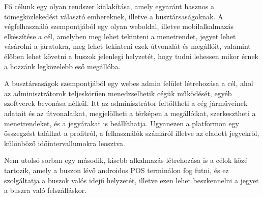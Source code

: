 Fő célunk egy olyan rendszer kialakítása, amely egyaránt hasznos a
tömegközlekedést választó embereknek, illetve a busztársaságoknak. A végfelhasználó
szempontjából egy olyan weboldal, illetve mobilalkalmazás elkészítése a cél, amelyben meg
lehet tekinteni a menetrendet, jegyet lehet vásárolni a járatokra, meg lehet tekinteni ezek útvonalát és megállóit, valamint élőben lehet követni a buszok jelenlegi helyzetét, hogy tudni lehessen mikor érnek a hozzánk legközelebb eső megállóba.

A busztársaságok szempontjából egy webes admin felület létrehozása a cél, ahol
az adminisztrátorok teljeskörűen menedzselhetik cégük működését, egyéb szoftverek bevonása nélkül. Itt az adminisztrátor feltöltheti a cég járműveinek adatait és az útvonalaikat, megjelölheti a térképen a megállóikat, szerkesztheti a menetrendeket, és a jegyárakat is beállíthatja. Ugyanezen a platformon egy összegzést találhat a profitról, a felhasználók számáról illetve az eladott jegyekről, különböző időintervallumokra leosztva.

Nem utolsó sorban egy második, kisebb alkalmazás létrehozása is a célok közé
tartozik, amely a buszon lévő androidos POS terminálon fog futni, és ez szolgáltatja a buszok valós idejű helyzetét, illetve ezen lehet beszkennelni a jegyet a buszra való felszálláskor.
